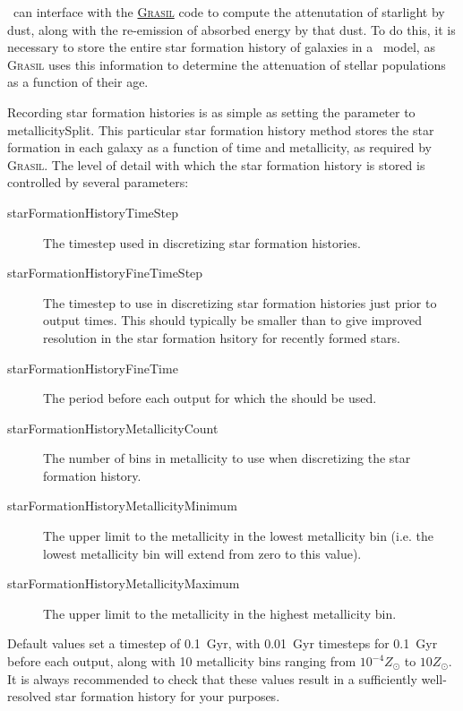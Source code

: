 \glc\ can interface with the \href{http://adlibitum.oat.ts.astro.it/silva/grasil/grasil.html}{\normalfont \scshape Grasil} code to compute the attenutation of starlight by dust, along with the re-emission of absorbed energy by that dust. To do this, it is necessary to store the entire star formation history of galaxies in a \glc\ model, as {\normalfont \scshape Grasil} uses this information to determine the attenuation of stellar populations as a function of their age.

Recording star formation histories is as simple as setting the {\normalfont \ttfamily [starFormationHistoriesMethod]} parameter to {\normalfont \ttfamily metallicitySplit}. This particular star formation history method stores the star formation in each galaxy as a function of time and metallicity, as required by {\normalfont \scshape Grasil}. The level of detail with which the star formation history is stored is controlled by several parameters:
\begin{description}
\item [{\normalfont \ttfamily starFormationHistoryTimeStep}] The timestep used in discretizing star formation histories.
\item [{\normalfont \ttfamily starFormationHistoryFineTimeStep}] The timestep to use in discretizing star formation histories just prior to output times. This should typically be smaller than {\normalfont \ttfamily [starFormationHistoryTimeStep]} to give improved resolution in the star formation hsitory for recently formed stars.
\item [{\normalfont \ttfamily starFormationHistoryFineTime}] The period before each output for which the {\normalfont \ttfamily [starFormationHistoryFineTimeStep]} should be used.
\item [{\normalfont \ttfamily starFormationHistoryMetallicityCount}] The number of bins in metallicity to use when discretizing the star formation history.
\item [{\normalfont \ttfamily starFormationHistoryMetallicityMinimum}] The upper limit to the metallicity in the lowest metallicity bin (i.e. the lowest metallicity bin will extend from zero to this value).
\item [{\normalfont \ttfamily starFormationHistoryMetallicityMaximum}] The upper limit to the metallicity in the highest metallicity bin.
\end{description}
Default values set a timestep of 0.1~Gyr, with 0.01~Gyr timesteps for 0.1~Gyr before each output, along with 10 metallicity bins ranging from $10^{-4}Z_\odot$ to $10Z_\odot$. It is always recommended to check that these values result in a sufficiently well-resolved star formation history for your purposes.

